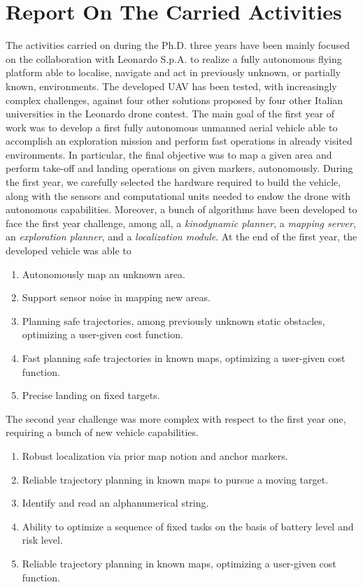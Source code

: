 \chapter*{Report On The Carried Activities}%

The activities carried on during the Ph.D. three years have been mainly focused on the collaboration with Leonardo S.p.A.
to realize a fully autonomous flying platform able to localise, navigate and act in previously unknown, or partially known, environments.
The developed UAV has been tested, with increasingly complex challenges, against four other solutions proposed by four other
Italian universities in the Leonardo drone contest.
The main goal of the first year of work was to develop a first fully autonomous unmanned aerial vehicle able to accomplish an exploration
mission and perform fast operations in already visited environments. In particular, the final objective was to map a given area
and perform take-off and landing operations on given markers, autonomously.
During the first year, we carefully selected the hardware required to build the vehicle, along with the sensors and computational units
needed to endow the drone with autonomous capabilities. Moreover, a bunch of algorithms have been developed to face the first year
challenge, among all, a \textit{kinodynamic planner}, a \textit{mapping server}, an \textit{exploration planner}, and a
\textit{localization module}. At the end of the first year, the developed vehicle was able to
\begin{enumerate}
	\item Autonomously map an unknown area.
	\item Support sensor noise in mapping new areas.
	\item Planning safe trajectories, among previously unknown static obstacles, optimizing a user-given cost function.
	\item Fast planning safe trajectories in known maps, optimizing a user-given cost function.
	\item Precise landing on fixed targets.
\end{enumerate}
The second year challenge was more complex with respect to the first year one, requiring a bunch of new vehicle capabilities.
\begin{enumerate}
	\item Robust localization via prior map notion and anchor markers.
	\item Reliable trajectory planning in known maps to pursue a moving target.
	\item Identify and read an alphanumerical string.
	\item Ability to optimize a sequence of fixed tasks on the basis of battery level and risk level.
	\item Reliable trajectory planning in known maps, optimizing a user-given cost function.
\end{enumerate}
